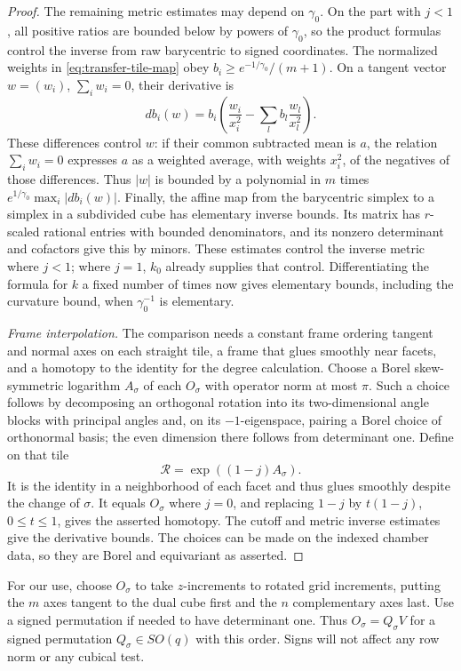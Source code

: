 \begin{proof}
The remaining metric estimates may depend on \(\gamma_0\).  On the part
with \(j<1\), all positive ratios are bounded below by powers of
\(\gamma_0\), so the product formulas control the inverse from raw
barycentric to signed coordinates.  The normalized weights in
\eqref{eq:transfer-tile-map} obey
\(b_i\geq e^{-1/\gamma_0}/(m+1)\).  On a tangent vector
\(w=(w_i)\), \(\sum_i w_i=0\), their derivative is
\[
             db_i(w)=b_i\left(\frac{w_i}{x_i^2}
                   -\sum_l b_l\frac{w_l}{x_l^2}\right).
\]
These differences control \(w\): if their common subtracted mean is
\(a\), the relation \(\sum_iw_i=0\) expresses \(a\) as a weighted
average, with weights \(x_i^2\), of the negatives of those differences.
Thus \(|w|\) is bounded by a polynomial in \(m\) times
\(e^{1/\gamma_0}\max_i|db_i(w)|\).  Finally, the affine map from the
barycentric simplex to a simplex in a subdivided cube has elementary
inverse bounds.  Its matrix has \(r\)-scaled rational entries with
bounded denominators, and its nonzero determinant and cofactors give
this by minors.  These estimates control the inverse metric where
\(j<1\); where \(j=1\), \(k_0\) already supplies that control.
Differentiating the formula for \(k\) a fixed number of times now gives
elementary bounds, including the curvature bound, when
\(\gamma_0^{-1}\) is elementary.

\medskip\noindent\emph{Frame interpolation.}
The comparison needs a constant frame ordering tangent and normal axes
on each straight tile, a frame that glues smoothly near facets, and a homotopy to the
identity for the degree calculation.  Choose a Borel skew-symmetric logarithm
\(A_\sigma\) of each \(O_\sigma\) with operator norm at most \(\pi\).
Such a choice follows by decomposing an orthogonal rotation into its
two-dimensional angle blocks with principal angles and, on its
\(-1\)-eigenspace, pairing a Borel choice of orthonormal basis; the
even dimension there follows from determinant one.  Define on that
tile
\[
                   \mathcal R=\exp((1-j)A_\sigma).
\]
It is the identity in a neighborhood of each facet and thus glues
smoothly despite the change of \(\sigma\).  It equals \(O_\sigma\)
where \(j=0\), and replacing \(1-j\) by \(t(1-j)\), \(0\leq t\leq1\),
gives the asserted homotopy.  The cutoff and metric inverse estimates
give the derivative bounds.  The choices can be made on the indexed
chamber data, so they are Borel and equivariant as asserted.
\end{proof}

For our use, choose \(O_\sigma\) to take \(z\)-increments to rotated
grid increments, putting the \(m\) axes tangent to the dual cube first
and the \(n\) complementary axes last.  Use a signed permutation if
needed to have determinant one.  Thus \(O_\sigma=Q_\sigma V\) for a
signed permutation \(Q_\sigma\in SO(q)\) with this order.  Signs will
not affect any row norm or any cubical test.

